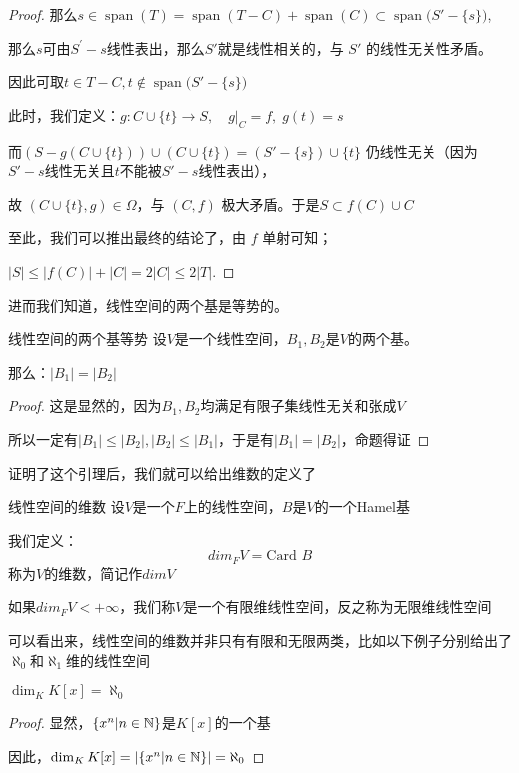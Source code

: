 \documentclass[12pt, a4paper, oneside, UTF8]{ctexbook}
\begin{document}
\begin{proof}
				那么$s\in\operatorname{span}(T)=\operatorname{span}(T- C)+\operatorname{span}(C)\subset \operatorname{span}\bigl(S'-\{s\}\bigr)$,
				
				那么$s$可由$S^\prime{}-{s}$线性表出，那么$S'$就是线性相关的，与 $S'$ 的线性无关性矛盾。
				
				因此可取$t\in T- C,t\notin\operatorname{span}\bigl(S'-\{s\}\bigr)$
				
				此时，我们定义：$g:C\cup\{t\}\longrightarrow S,\quad g|_C=f,\;g(t)=s$

				而$(S- g(C\cup\{t\}))\cup (C\cup\{t\})=(S'-\{s\})\cup\{t\}$ 仍线性无关（因为$S'-{s}$线性无关且$t$不能被$S'-{s}$线性表出），
				
				故 $(C\cup\{t\},g)\in\Omega$，与 $(C,f)$ 极大矛盾。于是$S\subset f(C)\cup C$

				至此，我们可以推出最终的结论了，由 $f$ 单射可知；
				
				$|S|\leqslant |f(C)|+|C|= 2|C|\leqslant 2|T|.$
			\end{proof}
			进而我们知道，线性空间的两个基是等势的。
			\begin{lemma}{线性空间的两个基等势}{}
				设$V$是一个线性空间，$B_1,B_2$是$V$的两个基。

				那么：$|B_1|=|B_2|$
			\end{lemma}
			\begin{proof}
				这是显然的，因为$B_1,B_2$均满足有限子集线性无关和张成$V$

				所以一定有$|B_1| \leqslant |B_2|,|B_2| \leqslant |B_1|$，于是有$|B_1|=|B_2|$，命题得证
			\end{proof}
			证明了这个引理后，我们就可以给出维数的定义了
			\begin{defn}{线性空间的维数}{}
				设$V$是一个$F$上的线性空间，$B$是$V$的一个Hamel基

				我们定义：
				\begin{equation}
					dim_F V = \text{Card }B
				\end{equation}
				称为$V$的维数，简记作$dim V$

				如果$dim_F V < +\infty$，我们称$V$是一个有限维线性空间，反之称为无限维线性空间
			\end{defn}
			可以看出来，线性空间的维数并非只有有限和无限两类，比如以下例子分别给出了$\aleph_0$和$\aleph_1$维的线性空间
			\begin{example}
				$\dim_K K[x] = \aleph_0$
			\end{example}
			\begin{proof}
				显然，$\{x^n | n \in \mathbb{N}\}$是$K[x]$的一个基

				因此，$\dim_K K[x] = |\{x^n | n \in \mathbb{N}\}| = \aleph_0$
			\end{proof}
\end{document}
